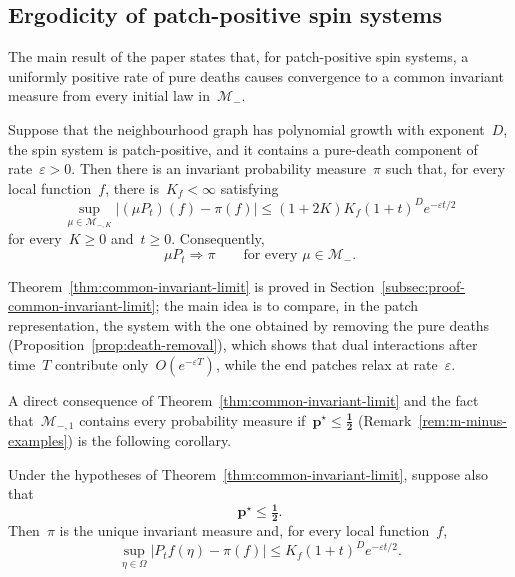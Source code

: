 \documentclass[EJP,preprint,NODS,nobera]{ejpecp}
\newcommand{\abs}[1]{\left|#1\right|}
\newcommand{\mb}[1]{\mathbf{#1}}
\newcommand{\mbs}[1]{\boldsymbol{#1}}
\begin{document}
\subsection{Ergodicity of patch-positive spin systems}
\label{subsec:main-theorem}

The main result of the paper states that, for patch-positive spin systems, a
uniformly positive rate of pure deaths causes convergence to a common
invariant measure from every initial law in~$\mathcal M_-$.

\begin{theorem}
\label{thm:common-invariant-limit}
Suppose that the neighbourhood graph has polynomial growth with exponent~$D$,
the spin system is patch-positive, and it contains a pure-death component of
rate~$\varepsilon>0$. Then there is an invariant probability measure~$\pi$
such that, for every local function~$f$, there is~$K_f<\infty$ satisfying
\begin{equation}
\label{eq:uniform-m-minus-convergence}
\sup_{\mu\in\mathcal M_{-,K}}
\abs{(\mu P_t)(f)-\pi(f)}
\leq
(1+2K)K_f(1+t)^D e^{-\varepsilon t/2}
\end{equation}
for every~$K\geq0$ and~$t\geq0$. Consequently,
\begin{equation*}
\mu P_t\Rightarrow\pi
\qquad
\text{for every }\mu\in\mathcal M_-.
\end{equation*}
\end{theorem}

Theorem~\ref{thm:common-invariant-limit} is proved in
Section~\ref{subsec:proof-common-invariant-limit}; the main idea is to compare,
in the patch representation, the system with the one obtained by removing the
pure deaths (Proposition~\ref{prop:death-removal}), which shows that dual
interactions after time~$T$ contribute only~$O(e^{-\varepsilon T})$, while the
end patches relax at rate~$\varepsilon$.

A direct consequence of Theorem~\ref{thm:common-invariant-limit} and the fact
that~$\mathcal M_{-,1}$ contains every probability measure
if~$\mb p^\star\leq\mbs{\tfrac12}$ (Remark~\ref{rem:m-minus-examples}) is the
following corollary.

\begin{corollary}
\label{cor:uniform-exponential-ergodicity}
Under the hypotheses of Theorem~\ref{thm:common-invariant-limit}, suppose also
that
\begin{equation*}
\mb p^\star\leq\mbs{\tfrac12}.
\end{equation*}
Then~$\pi$ is the unique invariant measure and, for every local function~$f$,
\begin{equation}
\label{eq:uniform-pointwise-convergence}
\sup_{\eta\in\Omega}
\abs{P_tf(\eta)-\pi(f)}
\leq
K_f(1+t)^D e^{-\varepsilon t/2}.
\end{equation}
\end{corollary}
\end{document}
